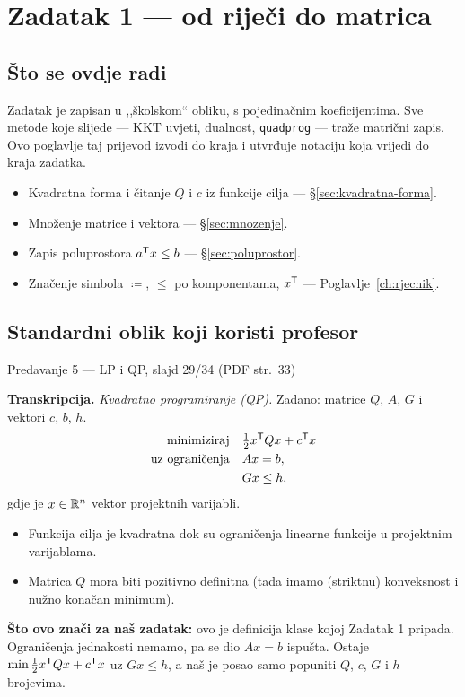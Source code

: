 \chapter{Zadatak 1 --- od riječi do matrica}
\label{ch:z1-formulacija}

\section{Što se ovdje radi}

Zadatak je zapisan u ,,školskom`` obliku, s pojedinačnim koeficijentima. Sve
metode koje slijede --- KKT uvjeti, dualnost, \texttt{quadprog} --- traže matrični
zapis. Ovo poglavlje taj prijevod izvodi do kraja i utvrđuje notaciju koja
vrijedi do kraja zadatka.

\begin{predznanje}
\begin{itemize}[nosep,leftmargin=*]
  \item Kvadratna forma i čitanje $Q$ i $c$ iz funkcije cilja --- \S\ref{sec:kvadratna-forma}.
  \item Množenje matrice i vektora --- \S\ref{sec:mnozenje}.
  \item Zapis poluprostora $a^{\mathsf{T}} x \leq b$ --- \S\ref{sec:poluprostor}.
  \item Značenje simbola $\coloneqq$, $\leq$ po komponentama, $x^{\mathsf{T}}$ --- Poglavlje~\ref{ch:rjecnik}.
\end{itemize}
\end{predznanje}

\section{Standardni oblik koji koristi profesor}
\label{sec:z1-standardni-oblik}

\begin{izvor}{Predavanje 5 --- LP i QP, slajd 29/34 (PDF str.~33)}

\textbf{Transkripcija.} \emph{Kvadratno programiranje (QP).} Zadano: matrice
$Q$, $A$, $G$ i vektori $c$, $b$, $h$.
\[
\begin{aligned}
\text{minimiziraj} \quad & \tfrac{1}{2}x^{\mathsf{T}} Q x + c^{\mathsf{T}} x \\
\text{uz ograničenja} \quad & Ax = b, \\
& Gx \leq h,
\end{aligned}
\]
gdje je $x \in \mathbb{R}^n$ vektor projektnih varijabli.
\begin{itemize}[nosep,leftmargin=*]
  \item Funkcija cilja je kvadratna dok su ograničenja linearne funkcije u
        projektnim varijablama.
  \item Matrica $Q$ mora biti pozitivno definitna (tada imamo (striktnu)
        konveksnost i nužno konačan minimum).
\end{itemize}

\textbf{Što ovo znači za naš zadatak:} ovo je definicija klase kojoj Zadatak 1
pripada. Ograničenja jednakosti nemamo, pa se dio $Ax = b$ ispušta. Ostaje
$\min \tfrac12 x^{\mathsf{T}} Qx + c^{\mathsf{T}} x$ uz $Gx \leq h$, a naš je posao samo
popuniti $Q$, $c$, $G$ i $h$ brojevima.
\end{izvor}

